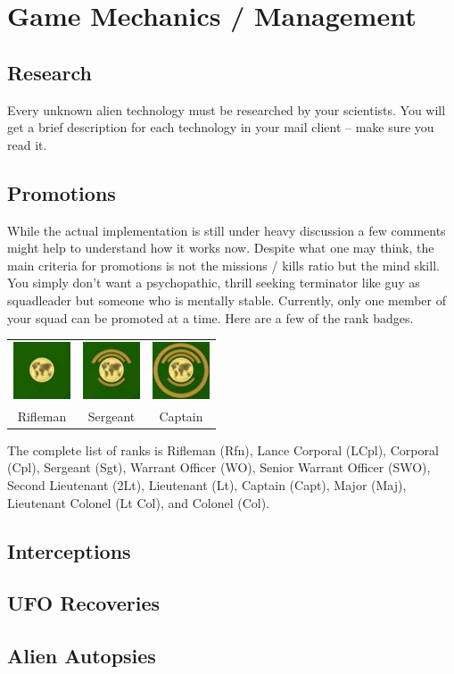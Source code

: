 \section{Game Mechanics / Management}
\subsection{Research}
Every unknown alien technology must be researched by your scientists. You will get a brief description for each technology in your mail client -- make sure you read it.

\subsection{Promotions}
While the actual implementation is still under heavy discussion a few comments might help to understand how it works now. Despite what one may think, the main criteria for promotions is not the missions / kills ratio but the mind skill. You simply don't want a psychopathic, thrill seeking terminator like guy as squadleader but someone who is mentally stable. Currently, only one member of your squad can be promoted at a time.  Here are a few of the rank badges.

\begin{tabular}{ccc}
\includegraphics[scale=1]{images/badges_rekrut_final.jpg} & \includegraphics[scale=1]{images/badges_sergeant_final.jpg} & \includegraphics[scale=1]{images/badges_hauptmann_final.jpg}\\
Rifleman & Sergeant & Captain\\
\end{tabular}

The complete list of ranks is Rifleman (Rfn), Lance Corporal (LCpl), Corporal (Cpl), Sergeant (Sgt), Warrant Officer (WO), Senior Warrant Officer (SWO), Second Lieutenant (2Lt), Lieutenant (Lt), Captain (Capt), Major (Maj), Lieutenant Colonel (Lt Col), and Colonel (Col).

\subsection{Interceptions}

\subsection{UFO Recoveries}

\subsection{Alien Autopsies}
